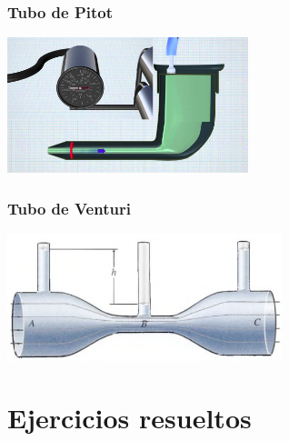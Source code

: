 \documentclass[handout]{beamer}
\begin{document}
\begin{frame}
  \frametitle{Tubo de Pitot}
  \begin{center}
    \includegraphics[width=7cm]{pitot}
  \end{center}
\end{frame}
\begin{frame}
  \frametitle{Tubo de Venturi}
  \begin{center}
    \includegraphics[width=8cm]{venturi}
  \end{center}
\end{frame}





\section{Ejercicios resueltos}
\end{document}
